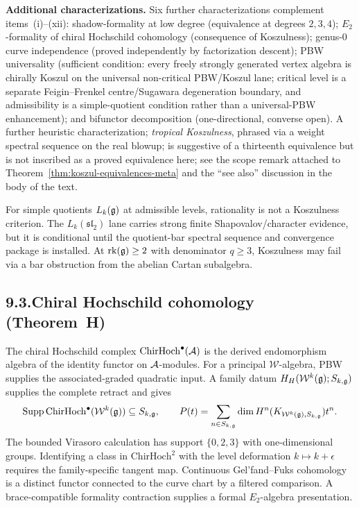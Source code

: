 \medskip
\noindent\textbf{Additional characterizations.}\enspace
Six further characterizations complement items~(i)--(xii):
shadow-formality at low degree (equivalence at degrees $2,3,4$);
$E_2$-formality of chiral Hochschild cohomology (consequence of
Koszulness); genus-$0$ curve independence (proved independently
by factorization descent); PBW universality (sufficient
condition: every freely strongly generated vertex algebra is
chirally Koszul on the universal non-critical PBW/Koszul lane;
critical level is a separate Feigin--Frenkel centre/Sugawara
degeneration boundary, and admissibility is a simple-quotient
condition rather than a universal-PBW enhancement); and bifunctor
decomposition (one-directional, converse open). A further
heuristic characterization; \emph{tropical Koszulness}, phrased
via a weight spectral sequence on the real blowup; is suggestive
of a thirteenth equivalence but is not inscribed as a proved
equivalence here; see the scope remark attached to
Theorem~\ref{thm:koszul-equivalences-meta} and the ``see also''
discussion in the body of the text.

For simple quotients $L_k(\mathfrak{g})$ at admissible levels, rationality is
not a Koszulness criterion. The $L_k(\mathfrak{sl}_2)$ lane carries
strong finite Shapovalov/character evidence, but it is conditional
until the quotient-bar spectral sequence and convergence package is
installed. At $\mathrm{rk}(\mathfrak{g})\ge 2$ with denominator $q\ge 3$,
Koszulness may fail via a bar obstruction from the abelian Cartan
subalgebra.

\subsection*{9.3.\enspace Chiral Hochschild cohomology (Theorem~H)}

The chiral Hochschild complex
$\mathrm{ChirHoch}^\bullet(\mathcal{A})$ is the derived endomorphism
algebra of the identity functor on $\mathcal{A}$-modules.  For a principal
$\mathcal W$-algebra, PBW supplies the associated-graded quadratic
input.  A family datum
$H_H(\mathcal W^k(\mathfrak{g});S_{k,\mathfrak{g}})$ supplies the complete retract and
gives
\[
\operatorname{Supp}\mathrm{ChirHoch}^\bullet
(\mathcal W^k(\mathfrak{g}))\subseteq S_{k,\mathfrak{g}},
\qquad
P(t)=\sum_{n\in S_{k,\mathfrak{g}}}
\dim H^n(K_{\mathcal W^k(\mathfrak{g}),S_{k,\mathfrak{g}}})t^n.
\]
The bounded Virasoro calculation has support $\{0,2,3\}$ with
one-dimensional groups.  Identifying a class in
$\mathrm{ChirHoch}^2$ with the level deformation
$k\mapsto k+\epsilon$ requires the family-specific tangent map.
Continuous Gel'fand--Fuks cohomology is a distinct functor connected
to the curve chart by a filtered comparison.  A brace-compatible
formality contraction supplies a formal $E_2$-algebra presentation.

